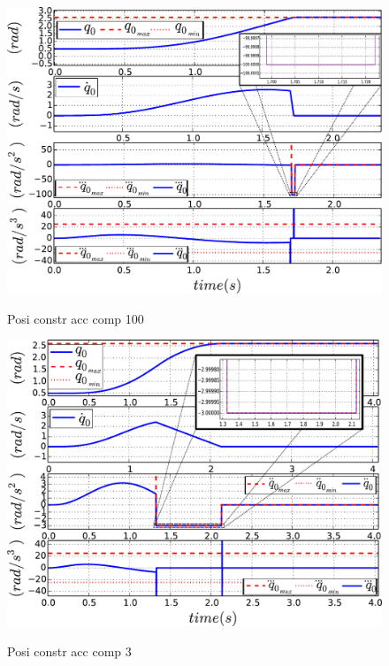 \documentclass[a4paper, 10pt, conference]{ieeeconf}      %
\begin{document}
{{\begin{figure}[!htbp]
{\includegraphics[width=1.0\columnwidth]{figures/4_Posi_constr_acc_comp_100}}
\caption{Posi constr acc comp 100} 
\label{fig:4_Posi_constr_acc_comp_100}
\end{figure}
\begin{figure}[!htbp]
\centering
{\includegraphics[width=1.0\columnwidth]{figures/5_Posi_constr_acc_comp_3}}
\caption{Posi constr acc comp 3} 
\label{fig:5_Posi_constr_acc_comp_3}
\end{figure}
\begin{figure}[!htbp]
\centering

\end{figure}}}
\end{document}
